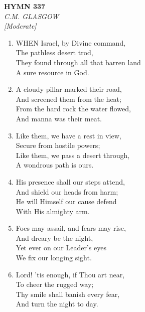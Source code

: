 \documentclass[11pt,a4paper]{article}
\begin{document}
\newpage
\begin{center}
    {\Large \textbf{HYMN 337}}
    \\
    \textit{C.M. GLASGOW}
    \\
    \textit{\small [Moderate]}
\end{center}
\vspace{1em}

\begin{enumerate}
    \item WHEN Israel, by Divine command, \\
        The pathless desert trod, \\
        They found through all that barren land \\
        A sure resource in God.

    \item A cloudy pillar marked their road, \\
        And screened them from the heat; \\
        From the hard rock the water flowed, \\
        And manna was their meat.

    \item Like them, we have a rest in view, \\
        Secure from hostile powers; \\
        Like them, we pass a desert through, \\
        A wondrous path is ours.

    \item His presence shall our steps attend, \\
        And shield our heads from harm; \\
        He will Himself our cause defend \\
        With His almighty arm.

    \item Foes may assail, and fears may rise, \\
        And dreary be the night, \\
        Yet ever on our Leader's eyes \\
        We fix our longing sight.

    \item Lord! 'tis enough, if Thou art near, \\
        To cheer the rugged way; \\
        Thy smile shall banish every fear, \\
        And turn the night to day.

\end{enumerate}
\end{document}
